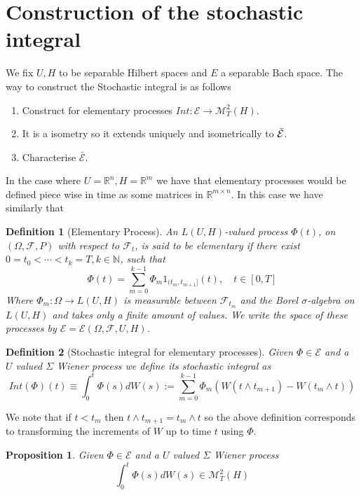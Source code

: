 \documentclass[12pt]{article}
\newcommand{\R}{{\mathbb R}}
\newcommand{\om}{\Omega}
\newtheorem{proposition}{Proposition}
\newtheorem{definition}{Definition}
\begin{document}
\section{Construction of the stochastic integral}
We fix $U,H$ to be separable Hilbert spaces and $E$ a separable Bach space.
The way to construct the Stochastic integral is as follows
\begin{enumerate}
	\item Construct for elementary processes $Int:\mathcal{E}\to\mathcal{M}_T^2(H)$.
	\item It is a isometry so it extends uniquely and isometrically to $\Bar{\mathcal{E}}$.
	\item Characterise $\bar{\mathcal{E}}$.
\end{enumerate}
In the case where $U=\R^n,H=\R^m$ we have that elementary processes would be defined piece wise in time as some matrices in $\R^{m\times n}$. In this case we have similarly that
\begin{definition}
	[Elementary Process] An $L(U, H)$-valued process $\Phi(t)$, on $(\Omega, \mathcal{F}, P)$ with respect to $\mathcal{F}_{t}$, is said to be elementary if there exist $0=t_{0}<\cdots<t_{k}=T, k \in \mathbb{N}$, such that
	$$
		\Phi(t)=\sum_{m=0}^{k-1} \Phi_{m} 1_{( t_{m}, t_{m+1}]}(t), \quad t \in[0, T]
	$$
	Where $\Phi_m:\om\to L(U,H)$ is measurable between $\mathcal{F}_{t_m}$ and the Borel $\sigma$-algebra on $L(U,H)$ and takes only a finite amount of values. We write the space of these processes by $\mathcal{E}=\mathcal{E}(\om,\mathcal{F},U,H)$.
\end{definition}
\begin{definition}[Stochastic integral for elementary processes]
	Given $\Phi\in\mathcal{E}$ and a $U$ valued $\Sigma$ Wiener process we define its stochastic integral as
	\begin{equation*}
		Int(\Phi)(t)\equiv \int_0^t\Phi(s)dW(s):=\sum_{m=0}^{k-1} \Phi_{m}(W(t\wedge t_{m+1})-W(t_m\wedge t))
	\end{equation*}
\end{definition}
We note that if $t<t_m$ then $t\wedge t_{m+1}=t_m\wedge t$ so the above definition corresponds to transforming the increments of $W$ up to time $t$ using $\Phi$.
\begin{proposition}
	Given $\Phi\in\mathcal{E}$ and a $U$ valued $\Sigma$ Wiener process
	\begin{equation*}
		\int_0^t\Phi(s)dW(s)\in\mathcal{M}_T^2(H)
	\end{equation*}
\end{proposition}
\end{document}
